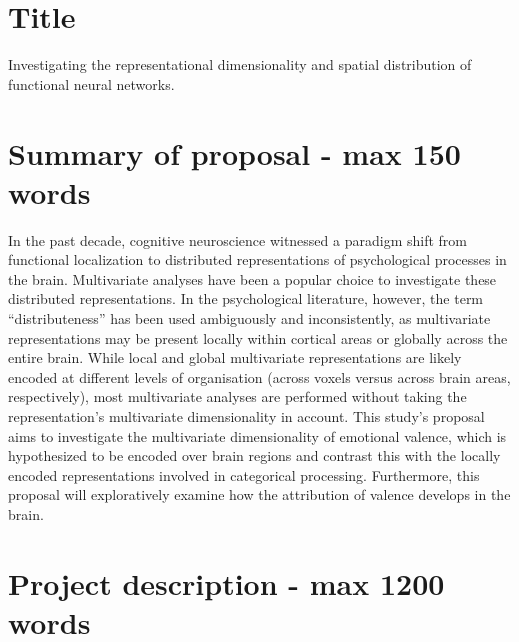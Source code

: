 \documentclass[12pt,a4paper]{article}\usepackage[]{graphicx}\usepackage[]{color}
\begin{document}
\section{Title}
Investigating the representational dimensionality and spatial distribution of functional neural networks.

\section{Summary of proposal \textmd{- max 150 words}}
In the past decade, cognitive neuroscience witnessed a paradigm shift from functional localization to distributed representations of psychological processes in the brain. Multivariate analyses have been a popular choice to investigate these distributed representations. In the psychological literature, however, the term ``distributeness'' has been used ambiguously and inconsistently, as multivariate representations may be present locally within cortical areas or globally across the entire brain. While local and global multivariate representations are likely encoded at different levels of organisation (across voxels versus across brain areas, respectively), most multivariate analyses are performed without taking the representation's multivariate dimensionality in account. This study's proposal aims to investigate the multivariate dimensionality of emotional valence, which is hypothesized to be encoded over brain regions and contrast this with the locally encoded representations involved in categorical processing. Furthermore, this proposal will exploratively examine how the attribution of valence develops in the brain. \\

\noindent
\wordcount

\section{Project description \textmd{- max 1200 words}}
\end{document}
